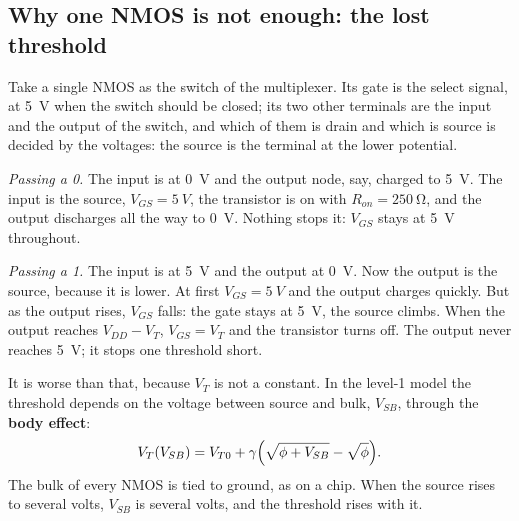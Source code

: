 \documentclass[11pt,a4paper]{article}
\newcommand{\VDD}{V_{DD}}
\newcommand{\VT}{V_{T}}
\begin{document}
\subsection{Why one NMOS is not enough: the lost threshold}
\label{sec:pass}

Take a single NMOS as the switch of the multiplexer. Its gate is the
select signal, at \SI{5}{V} when the switch should be closed; its two
other terminals are the input and the output of the switch, and which
of them is drain and which is source is decided by the voltages:
the source is the terminal at the lower potential.

\emph{Passing a 0.} The input is at \SI{0}{V} and the output node, say,
charged to \SI{5}{V}. The input is the source, $V_{GS}=\SI{5}{V}$, the
transistor is on with $R_{on}=\SI{250}{\ohm}$, and the output
discharges all the way to \SI{0}{V}. Nothing stops it: $V_{GS}$ stays
at \SI{5}{V} throughout.

\emph{Passing a 1.} The input is at \SI{5}{V} and the output at
\SI{0}{V}. Now the output is the source, because it is lower. At first
$V_{GS}=\SI{5}{V}$ and the output charges quickly. But as the output
rises, $V_{GS}$ falls: the gate stays at \SI{5}{V}, the source
climbs. When the output reaches $\VDD-\VT$, $V_{GS}=\VT$ and the
transistor turns off. The output never reaches \SI{5}{V}; it stops one
threshold short.

It is worse than that, because $\VT$ is not a constant. In the level-1
model the threshold depends on the voltage between source and bulk,
$V_{SB}$, through the \textbf{body effect}:
\begin{equation}
    \VT(V_{SB}) = V_{T0} + \gamma\Bigl(\sqrt{\phi+V_{SB}} - \sqrt{\phi}\Bigr).
    \label{eq:body}
\end{equation}
The bulk of every NMOS is tied to ground, as on a chip. When the source
rises to several volts, $V_{SB}$ is several volts, and the threshold
rises with it.
\end{document}
